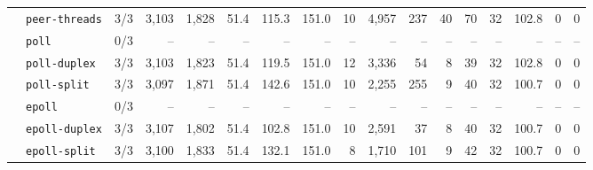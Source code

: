\begin{longtable}{@{}llrrrrrrrrrrrrrrr@{}}
 & \texttt{peer-threads} & 3/3 & 3{,}103 & 1{,}828 & 51.4 & 115.3 & 151.0 & 10 & 4{,}957 & 237 & 40 & 70 & 32 & 102.8 & 0 & 0 \\
 & \texttt{poll} & 0/3 & -- & -- & -- & -- & -- & -- & -- & -- & -- & -- & -- & -- & -- & -- \\
 & \texttt{poll-duplex} & 3/3 & 3{,}103 & 1{,}823 & 51.4 & 119.5 & 151.0 & 12 & 3{,}336 & 54 & 8 & 39 & 32 & 102.8 & 0 & 0 \\
 & \texttt{poll-split} & 3/3 & 3{,}097 & 1{,}871 & 51.4 & 142.6 & 151.0 & 10 & 2{,}255 & 255 & 9 & 40 & 32 & 100.7 & 0 & 0 \\
 & \texttt{epoll} & 0/3 & -- & -- & -- & -- & -- & -- & -- & -- & -- & -- & -- & -- & -- & -- \\
 & \texttt{epoll-duplex} & 3/3 & 3{,}107 & 1{,}802 & 51.4 & 102.8 & 151.0 & 10 & 2{,}591 & 37 & 8 & 40 & 32 & 100.7 & 0 & 0 \\
 & \texttt{epoll-split} & 3/3 & 3{,}100 & 1{,}833 & 51.4 & 132.1 & 151.0 & 8 & 1{,}710 & 101 & 9 & 42 & 32 & 100.7 & 0 & 0 \\
\end{longtable}
